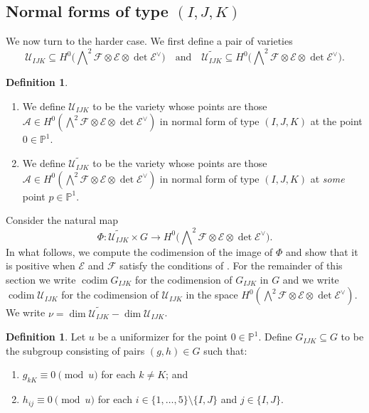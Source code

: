 \documentclass[11pt]{amsart}
\numberwithin{theorem}{section}
\numberwithin{equation}{section}
\theoremstyle{definition}\newtheorem{defn}[theorem]{Definition}
\theoremstyle{definition}\newtheorem{remark}[theorem]{Remark}
\theoremstyle{definition}\newtheorem{question}[theorem]{Question}
\theoremstyle{definition}\newtheorem{problem}[theorem]{Problem}
\newcommand{\PP}{\mathbb{P}}
\newcommand{\cE}{\mathcal{E}}
\newcommand{\cF}{\mathcal{F}}
\newcommand{\cA}{\mathcal{A}}
\DeclareMathOperator{\codim}{codim}
\renewcommand{\subset}{\subseteq}
\newcommand{\marksing}{\mathcal{U}}
\newcommand{\I}{I}
\newcommand{\J}{J}
\newcommand{\K}{K}
\begin{document}
\subsection{Normal forms of type $(\I,\J,\K)$}
We now turn to the harder case. 
We first define a pair of varieties
\[
\marksing_{\I\J\K} \subset H^0 \Big(\bigwedge\nolimits^2 \cF \otimes \cE \otimes \det \cE^\vee \Big) \quad \text{and} \quad
\widetilde{\marksing_{\I\J\K}} \subseteq H^0 \Big(\bigwedge\nolimits^2 \cF \otimes \cE \otimes \det \cE^\vee \Big).
\]

\vspace{1em}
\begin{defn}\hfill
\begin{enumerate}
    \item We define $\marksing_{\I\J\K}$ to be the variety whose points are those $\cA \in H^0(\bigwedge^2 \cF \otimes \cE \otimes \det \cE^\vee )$ in normal form of type $(\I,\J,\K)$ at the point $0 \in \PP^1$.
    \item We define $\widetilde{\marksing_{\I\J\K}}$ to be the variety whose points are those $\cA \in H^0(\bigwedge^2 \cF \otimes \cE \otimes \det \cE^\vee)$ in normal form of type $(\I,\J,\K)$ at \emph{some} point $p \in \PP^1$.
\end{enumerate}
\end{defn}

Consider the natural map
\[
    \Phi \colon \widetilde{\marksing_{\I\J\K}} \times G \rightarrow H^0 \Big(\bigwedge\nolimits^2 \cF \otimes \cE \otimes \det \cE^\vee \Big).
\]
In what follows, we compute the codimension of the image of $\Phi$ and show that it is positive when $\cE$ and $\cF$ satisfy the conditions of . For the remainder of this section we write $\codim G_{\I\J\K}$ for the codimension of $G_{\I\J\K}$ in $G$ and we write $\codim \marksing_{\I\J\K}$ for the codimension of $\marksing_{\I\J\K}$ in the space $H^0(\bigwedge^2 \cF \otimes \cE \otimes \det \cE^\vee)$. We write $\nu = \dim \widetilde{\marksing_{\I\J\K}} - \dim \marksing_{\I\J\K}$.

\begin{defn}
Let $u$ be a uniformizer for the point $0 \in \PP^1$. Define $G_{\I\J\K} \subseteq G$ to be the subgroup consisting of pairs $(g,h) \in G$ such that:
\begin{enumerate}[label=(\roman*)]
    \item $g_{k \K} \equiv 0 \pmod{u}$ for each $k \neq \K$; and 
    \item $h_{i j} \equiv 0 \pmod{u}$ for each $i \in \{1,\dots,5\}\setminus\{\I,\J\}$ and $j \in \{\I,\J\}$. 
\end{enumerate}
\end{defn}
\end{document}
